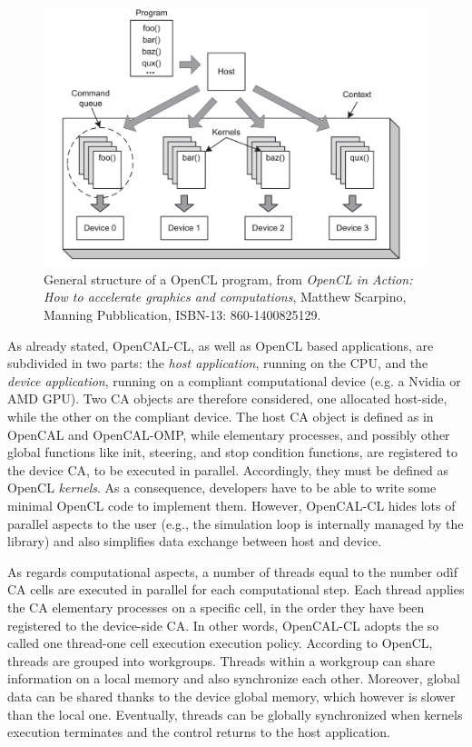 \begin{figure}[tp]
  \begin{center}
    \includegraphics[width=12cm]{./images/OpenCAL-CL/kernelDistribution}
    \caption{General structure of a OpenCL program, from \emph{OpenCL
        in Action: How to accelerate graphics and computations},
      Matthew Scarpino, Manning Pubblication, ISBN-13:
      860-1400825129.}
    \label{fig:GeneralStructure}
  \end{center}
\end{figure}

As already stated, OpenCAL-CL, as well as OpenCL based applications,
are subdivided in two parts: the \emph{host application}, running on
the CPU, and the \emph{device application}, running on a compliant
computational device (e.g. a Nvidia or AMD GPU). Two CA objects are
therefore considered, one allocated host-side, while the other on the
compliant device. The host CA object is defined as in OpenCAL and
OpenCAL-OMP, while elementary processes, and possibly other global
functions like init, steering, and stop condition functions, are
registered to the device CA, to be executed in parallel. Accordingly,
they must be defined as OpenCL \emph{kernels}. As a consequence,
developers have to be able to write some minimal OpenCL code to
implement them. However, OpenCAL-CL hides lots of parallel aspects to
the user (e.g., the simulation loop is internally managed by the
library) and also simplifies data exchange between host and device.

As regards computational aspects, a number of threads equal to the
number odìf CA cells are executed in parallel for each computational
step. Each thread applies the CA elementary processes on a specific
cell, in the order they have been registered to the device-side CA. In
other words, OpenCAL-CL adopts the so called one thread-one cell
execution execution policy. According to OpenCL, threads are grouped
into workgroups. Threads within a workgroup can share information on a
local memory and also synchronize each other. Moreover, global data
can be shared thanks to the device global memory, which however is
slower than the local one. Eventually, threads can be globally
synchronized when kernels execution terminates and the control
returns to the host application.

